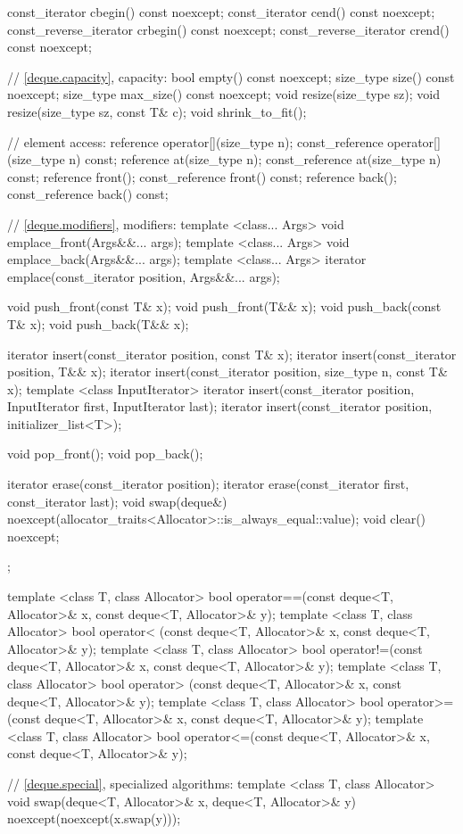 \begin{codeblock}
{{    const_iterator         cbegin() const noexcept;
    const_iterator         cend() const noexcept;
    const_reverse_iterator crbegin() const noexcept;
    const_reverse_iterator crend() const noexcept;

    // \ref{deque.capacity}, capacity:
    bool      empty() const noexcept;
    size_type size() const noexcept;
    size_type max_size() const noexcept;
    void      resize(size_type sz);
    void      resize(size_type sz, const T& c);
    void      shrink_to_fit();

    // element access:
    reference       operator[](size_type n);
    const_reference operator[](size_type n) const;
    reference       at(size_type n);
    const_reference at(size_type n) const;
    reference       front();
    const_reference front() const;
    reference       back();
    const_reference back() const;

    // \ref{deque.modifiers}, modifiers:
    template <class... Args> void emplace_front(Args&&... args);
    template <class... Args> void emplace_back(Args&&... args);
    template <class... Args> iterator emplace(const_iterator position, Args&&... args);

    void push_front(const T& x);
    void push_front(T&& x);
    void push_back(const T& x);
    void push_back(T&& x);

    iterator insert(const_iterator position, const T& x);
    iterator insert(const_iterator position, T&& x);
    iterator insert(const_iterator position, size_type n, const T& x);
    template <class InputIterator>
      iterator insert(const_iterator position, InputIterator first, InputIterator last);
    iterator insert(const_iterator position, initializer_list<T>);

    void pop_front();
    void pop_back();

    iterator erase(const_iterator position);
    iterator erase(const_iterator first, const_iterator last);
    void     swap(deque&)
      noexcept(allocator_traits<Allocator>::is_always_equal::value);
    void     clear() noexcept;
  };

  template <class T, class Allocator>
    bool operator==(const deque<T, Allocator>& x, const deque<T, Allocator>& y);
  template <class T, class Allocator>
    bool operator< (const deque<T, Allocator>& x, const deque<T, Allocator>& y);
  template <class T, class Allocator>
    bool operator!=(const deque<T, Allocator>& x, const deque<T, Allocator>& y);
  template <class T, class Allocator>
    bool operator> (const deque<T, Allocator>& x, const deque<T, Allocator>& y);
  template <class T, class Allocator>
    bool operator>=(const deque<T, Allocator>& x, const deque<T, Allocator>& y);
  template <class T, class Allocator>
    bool operator<=(const deque<T, Allocator>& x, const deque<T, Allocator>& y);

  // \ref{deque.special}, specialized algorithms:
  template <class T, class Allocator>
    void swap(deque<T, Allocator>& x, deque<T, Allocator>& y)
      noexcept(noexcept(x.swap(y)));
}
\end{codeblock}

